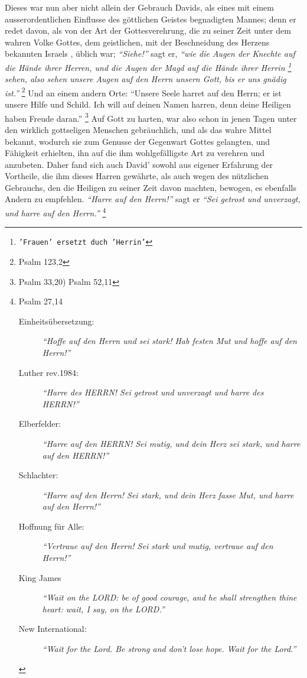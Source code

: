 \medskip

Dieses war nun aber nicht allein der Gebrauch Davids, als eines mit einem
ausserordentlichen Einflusse des göttlichen Geistes begnadigten Mannes; denn er
redet davon, als von der Art der Gottesverehrung, die zu seiner Zeit unter dem
wahren Volke Gottes, dem geistlichen, mit der
Beschneidung des Herzens  bekannten
Israels  , üblich war; \textit{"`Siehe!"'} sagt er,
\textit{"`wie die Augen der Knechte auf die
Hände ihrer Herren, und die Augen der Magd auf die Hände ihrer Herrin
\footnote{\texttt{'Frauen' ersetzt duch 'Herrin'}} sehen,
also sehen unsere Augen auf den Herrn unsern Gott, bis er uns gnädig
ist."'} 
\footnote{Psalm 123,2}
Und an einem andern Orte:
"`Unsere Seele harret auf den Herrn; er ist unsere Hilfe und Schild. Ich will
auf deinen Namen harren,
denn deine Heiligen haben Freude daran."'
\footnote{Psalm 33,20)  Psalm 52,11}
Auf Gott zu harten, war also schon in jenen Tagen unter den wirklich gottseligen
Menschen gebräuchlich, und als das wahre Mittel bekannt, wodurch sie zum Genusse
der Gegenwart Gottes  gelangten, und Fähigkeit
erhielten, ihn auf die ihm
wohlgefälligste Art zu verehren und anzubeten. Daher fand sich auch David'
sowohl aus eigener Erfahrung der Vortheile, die ihm
dieses Harren gewährte, als
auch wegen des nützlichen Gebrauchs, den die Heiligen zu seiner Zeit davon
machten, bewogen, es ebenfalls Andern zu empfehlen.
\textit{"`Harre auf den Herrn!"'}  sagt
er
\textit{"`Sei getrost und unverzagt, und harre auf den Herrn."'}
\footnote{Psalm 27,14
\begin{description}
 \item[Einheitsübersetzung:] \textit{"`Hoffe auf den Herrn und sei stark! Hab
festen Mut und hoffe auf den Herrn!"'}
 \item[Luther rev.1984:] \textit{"`Harre des HERRN! Sei getrost und unverzagt
und harre des HERRN!"'} 
 \item[Elberfelder:] \textit{"`Harre auf den HERRN! Sei mutig, und dein Herz sei
stark, und harre auf den HERRN!"'}
 \item[Schlachter:] \textit{"`Harre auf den Herrn! Sei stark, und dein Herz
fasse Mut, und harre auf den Herrn!"'}
 \item[Hoffnung für Alle:] \textit{"`Vertraue auf den Herrn! Sei stark und
mutig, vertraue auf den Herrn!"'}
 \item[King James] 
\textit{ "`Wait on the LORD: be of good courage, and he shall strengthen thine
heart: wait, I say, on the LORD."'}
 \item[New International:] \textit{ "`Wait for the Lord. Be strong and don't
lose hope. Wait for the Lord."'}
 \end{description}
}
